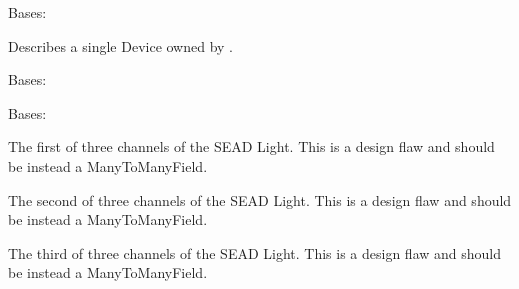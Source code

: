 \documentclass[letterpaper,10pt,english]{sphinxmanual}
\begin{document}
\begin{fulllineitems}
\label{modules/microdata:microdata.models.Device}
Bases: 

Describes a single Device owned by .

\begin{fulllineitems}
\label{modules/microdata:microdata.models.Device.DoesNotExist}
Bases: 

\end{fulllineitems}


\begin{fulllineitems}
\label{modules/microdata:microdata.models.Device.MultipleObjectsReturned}
Bases: 

\end{fulllineitems}


\begin{fulllineitems}
\label{modules/microdata:microdata.models.Device.channel_1}
The first of three channels of the SEAD Light. This is a design flaw and should be instead a ManyToManyField.

\end{fulllineitems}


\begin{fulllineitems}
\label{modules/microdata:microdata.models.Device.channel_2}
The second of three channels of the SEAD Light. This is a design flaw and should be instead a ManyToManyField.

\end{fulllineitems}


\begin{fulllineitems}
\label{modules/microdata:microdata.models.Device.channel_3}
The third of three channels of the SEAD Light. This is a design flaw and should be instead a ManyToManyField.


\end{fulllineitems}
\end{fulllineitems}
\end{document}
